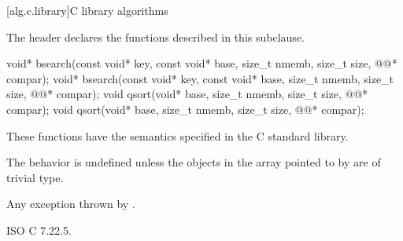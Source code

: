 [alg.c.library]{C library algorithms}

\pnum
{}%
\begin{note}
The header 
declares the functions described in this subclause.
\end{note}

%
%
\begin{itemdecl}
void* bsearch(const void* key, const void* base, size_t nmemb, size_t size,
              @@* compar);
void* bsearch(const void* key, const void* base, size_t nmemb, size_t size,
              @@* compar);
void qsort(void* base, size_t nmemb, size_t size, @@* compar);
void qsort(void* base, size_t nmemb, size_t size, @@* compar);
\end{itemdecl}

\begin{itemdescr}
\pnum
\effects
These functions have the semantics specified in the C standard library.

\pnum
\remarks
The behavior is undefined
unless the objects in the array pointed to by  are of trivial type.

\pnum
\throws
Any exception thrown by .
\end{itemdescr}

\xref
ISO C 7.22.5.

